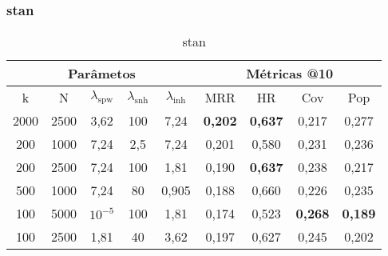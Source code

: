 \subsubsection{stan}



\begin{table}[htbp]
    \centering
    \begin{tabular}{|c|c|c|c|c|c|c|c|c|}
      \hline
      \multicolumn{5}{|c|}{Parâmetos} & \multicolumn{4}{c|}{Métricas @10} \\
      \hline
      k & N & $\lambda_{\text{spw}}$ & $\lambda_{\text{snh}}$ & $\lambda_{\text{inh}}$ & MRR & HR & Cov & Pop \\
      \hline
      2000 & 2500 & 3,62 & 100 & 7,24 & \textbf{0,202} & \textbf{0,637} & 0,217 & 0,277 \\
      \hline
      200 & 1000 & 7,24 & 2,5 & 7,24 & 0,201 & 0,580 & 0,231 & 0,236 \\
      \hline
      200 & 2500 & 7,24 & 100 & 1,81& 0,190 & \textbf{0,637} & 0,238 & 0,217 \\
      \hline
      500 & 1000 & 7,24 & 80 & 0,905 & 0,188 & 0,660 & 0,226 & 0,235 \\
      \hline
      100 & 5000 & $10^{-5}$ & 100 & 1,81 & 0,174 & 0,523 & \textbf{0,268} & \textbf{0,189} \\
      \hline
      100 & 2500 & 1,81 & 40 & 3,62 & 0,197 & 0,627 & 0,245 & 0,202 \\
      \hline

    \end{tabular}
    \caption{stan}
  \end{table}


